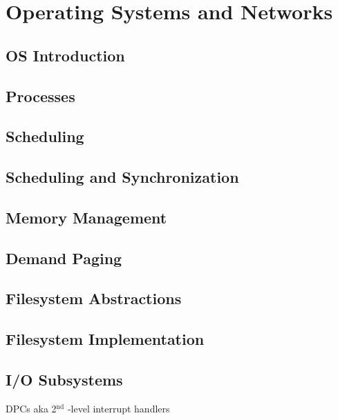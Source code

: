 \documentclass[11pt]{article}
\author{Silvan Mosberger}
\date{\today}
\title{}
\begin{document}
\tableofcontents

\section{Operating Systems and Networks}
\label{sec:orge9da75c}

\subsection{OS Introduction}
\label{sec:org018d5bc}
\subsection{Processes}
\label{sec:org36d27e3}
\subsection{Scheduling}
\label{sec:org2c07ba1}
\subsection{Scheduling and Synchronization}
\label{sec:org9b56213}
\subsection{Memory Management}
\label{sec:org69e7c35}
\subsection{Demand Paging}
\label{sec:org63072bc}
\subsection{Filesystem Abstractions}
\label{sec:org4268398}
\subsection{Filesystem Implementation}
\label{sec:org57aee78}
\subsection{I/O Subsystems}
\label{sec:orga89cbfb}

DPCs aka 2\(^{\text{nd}}\) -level interrupt handlers 
\end{document}
